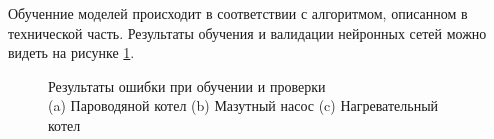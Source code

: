 Обученние моделей происходит в соответствии с алгоритмом, описанном в технической часть. Результаты обучения и валидации нейронных сетей можно видеть на рисунке \ref{fig:test:plot:learning}.

\begin{figure}[H]
  \centering
  \caption{Результаты ошибки при обучении и проверки\\(a) Пароводяной котел (b) Мазутный насос (c) Нагревательный котел}\label{fig:test:plot:learning}
\end{figure}

